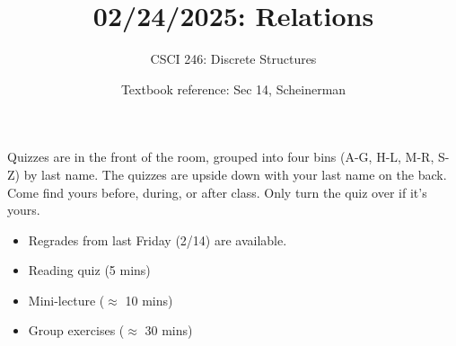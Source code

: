 \documentclass[10pt]{beamer}
\begin{document}






\title{02/24/2025: Relations}
\author{CSCI 246: Discrete Structures}
\date{Textbook reference: Sec 14, Scheinerman}

\begin{frame}
    \titlepage 
\end{frame}


\begin{frame}
\footnotesize 
\begin{mygreenbox}[title=Graded Quiz Pickup]
Quizzes are in the front of the room, grouped into four bins (A-G, H-L, M-R, S-Z) by last name. The quizzes are upside down with your last name on the back. Come find yours before, during, or after class.  Only turn the quiz over if it's yours.
\end{mygreenbox} 
\vfill 

\begin{myredbox}[title=Announcements]

\begin{itemize}
\item Regrades from last Friday (2/14) are available.  
\end{itemize}

\end{myredbox}

\vfill 


\begin{myyellowbox}[title=Today's Agenda]
\begin{itemize}
	\item Reading quiz (5 mins)
	\item Mini-lecture ($\approx$ 10 mins)
	\item Group exercises ($\approx$ 30 mins)
\end{itemize}

%	
\end{myyellowbox}
\vfill 

\end{frame}
\end{document}
